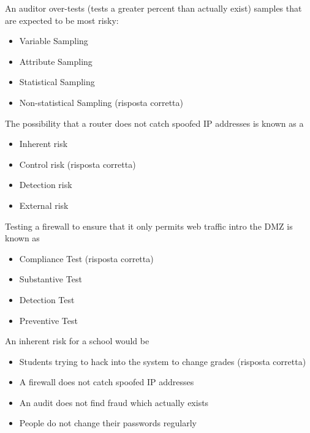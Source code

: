 
An auditor over-tests (tests a greater percent than actually exist) samples that are expected to be most risky:
\begin{itemize}
\item Variable Sampling
\item Attribute Sampling
\item Statistical Sampling
\item Non-statistical Sampling (risposta corretta)
\end{itemize}


The possibility that a router does not catch spoofed IP addresses is known as a

\begin{itemize}
\item Inherent risk
\item Control risk (risposta corretta)
\item Detection risk
\item External risk
\end{itemize}



Testing a firewall to ensure that it only permits web traffic intro the DMZ is known as

\begin{itemize}
\item Compliance Test (risposta corretta)
\item Substantive Test
\item Detection Test
\item Preventive Test
\end{itemize}


An inherent risk for a school would be

\begin{itemize}
\item Students trying to hack into the system to change grades (risposta corretta)
\item A firewall does not catch spoofed IP addresses
\item An audit does not find fraud which actually exists
\item People do not change their passwords regularly
\end{itemize}


